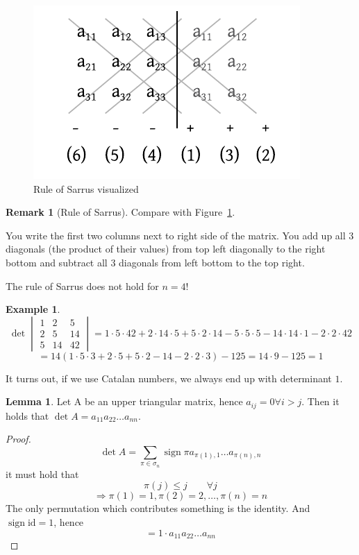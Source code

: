 \documentclass[a4paper,landscape,twocolumn]{article}
\theoremstyle{definition}
\newtheorem{ex}{Example}
\newtheorem{rem}{Remark}
\newtheorem{lemma}{Lemma}
\DeclareMathOperator\sign{sign}
\begin{document}
\begin{figure}[!h]
  \begin{center}
    \includegraphics{img/rule_of_sarrus.pdf}
    \caption{Rule of Sarrus visualized}
    \label{img:sarrus}
  \end{center}
\end{figure}

\begin{rem}[Rule of Sarrus]
  Compare with Figure~\ref{img:sarrus}.

  You write the first two columns next to right side of the matrix.
  You add up all 3 diagonals (the product of their values) from top left diagonally to the right bottom
  and subtract all 3 diagonals from left bottom to the top right.

  The rule of Sarrus does not hold for $n=4$!
\end{rem}

\begin{ex}
  \[
    \det\begin{vmatrix} 1 & 2 & 5 \\ 2 & 5 & 14 \\ 5 & 14 & 42 \end{vmatrix}
      = 1 \cdot 5 \cdot 42 + 2 \cdot 14 \cdot 5 + 5 \cdot 2 \cdot 14
      - 5 \cdot 5 \cdot 5 - 14 \cdot 14 \cdot 1 - 2 \cdot 2 \cdot 42
  \] \[
    = 14 (1 \cdot 5 \cdot 3 + 2 \cdot 5 + 5 \cdot 2 - 14 - 2 \cdot 2 \cdot 3) - 125
    = 14 \cdot 9 - 125 = 1
  \]

  It turns out, if we use Catalan numbers, we always end up with determinant $1$.
\end{ex}

\begin{lemma}
  Let A be an upper triangular matrix, hence $a_{ij} = 0 \forall i > j$.
  Then it holds that $\det{A} = a_{11} a_{22} \ldots a_{nn}$.
\end{lemma}
\begin{proof}
  \[ \det{A} = \sum_{\pi \in \sigma_n} \sign{\pi} a_{\pi(1),1} \ldots a_{\pi(n),n} \]
  it must hold that
  \[ \pi(j) \leq j \qquad \forall j \]
  \[ \Rightarrow \pi(1) = 1, \pi(2) = 2, \ldots, \pi(n) = n \]
  The only permutation which contributes something is the identity.
  And $\sign{\text{id}} = 1$, hence
  \[ = 1 \cdot a_{11} a_{22} \ldots a_{nn} \]
\end{proof}
\end{document}
